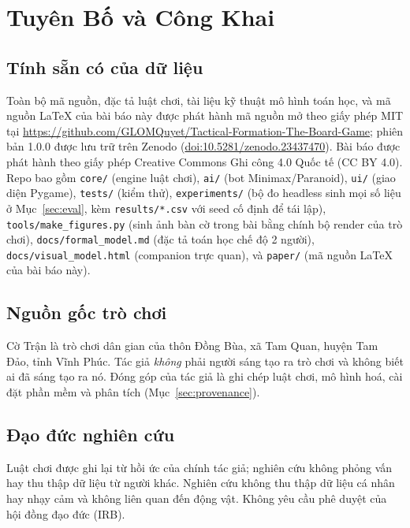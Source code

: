 \section*{Tuyên Bố và Công Khai}
\label{sec:disclosures}

\subsection*{Tính sẵn có của dữ liệu}

Toàn bộ mã nguồn, đặc tả luật chơi, tài liệu kỹ thuật mô hình toán
học, và mã nguồn LaTeX của bài báo này được phát hành mã nguồn mở theo
giấy phép MIT tại
\url{https://github.com/GLOMQuyet/Tactical-Formation-The-Board-Game};
phiên bản 1.0.0 được lưu trữ trên Zenodo
(\href{https://doi.org/10.5281/zenodo.23437470}{doi:10.5281/zenodo.23437470}). Bài báo được phát hành theo giấy phép
Creative Commons Ghi công 4.0 Quốc tế (CC BY 4.0).
Repo bao gồm \texttt{core/} (engine luật chơi), \texttt{ai/} (bot
Minimax/Paranoid), \texttt{ui/} (giao diện Pygame), \texttt{tests/}
(kiểm thử), \texttt{experiments/} (bộ đo headless sinh mọi số liệu ở
Mục~\ref{sec:eval}, kèm \texttt{results/*.csv} với seed cố định để tái
lập), \texttt{tools/make\_figures.py} (sinh ảnh bàn cờ trong bài bằng
chính bộ render của trò chơi), \texttt{docs/formal\_model.md} (đặc tả toán
học chế độ 2 người), \texttt{docs/visual\_model.html} (companion trực
quan), và \texttt{paper/} (mã nguồn LaTeX của bài báo này).

\subsection*{Nguồn gốc trò chơi}

Cờ Trận là trò chơi dân gian của thôn Đồng Bùa, xã Tam Quan, huyện Tam
Đảo, tỉnh Vĩnh Phúc. Tác giả \emph{không} phải người sáng tạo ra trò chơi
và không biết ai đã sáng tạo ra nó. Đóng góp của tác giả là ghi chép luật
chơi, mô hình hoá, cài đặt phần mềm và phân tích
(Mục~\ref{sec:provenance}).

\subsection*{Đạo đức nghiên cứu}

Luật chơi được ghi lại từ hồi ức của chính tác giả; nghiên cứu không phỏng
vấn hay thu thập dữ liệu từ người khác. Nghiên cứu không thu thập dữ liệu
cá nhân hay nhạy cảm và không liên quan đến động vật. Không yêu cầu phê
duyệt của hội đồng đạo đức (IRB).

